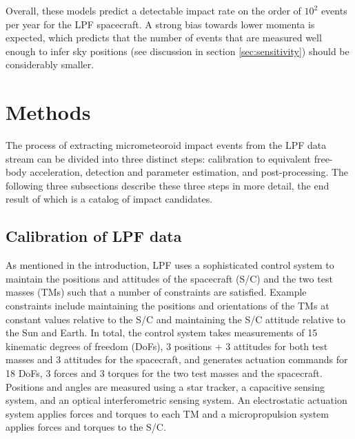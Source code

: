 \documentclass[twocolumn, trackchanges]{aastex62}
\begin{document}
Overall, these models predict a detectable impact rate on the order of $10^2$ events per year for the LPF spacecraft.  A strong bias towards lower momenta is expected, which predicts that the number of events that are measured well enough to infer sky positions (see discussion in section \ref{sec:sensitivity}) should be considerably smaller. 

\section{Methods} \label{sec:methods}
The process of extracting micrometeoroid impact events from the LPF data stream can be divided into three distinct steps: calibration to equivalent free-body acceleration, detection and parameter estimation, and post-processing.  The following three subsections describe these three steps in more detail, the end result of which is a catalog of impact candidates.


\subsection{Calibration of LPF data}\label{sec:calibration}
As mentioned in the introduction, LPF uses a sophisticated control system to maintain the positions and attitudes of the spacecraft (S/C) and the two test masses (TMs) such that a number of constraints are satisfied.  Example constraints include maintaining the positions and orientations of the TMs at constant values relative to the S/C and maintaining the S/C attitude relative to the Sun and Earth. In total, the control system takes measurements of 15 kinematic degrees of freedom (DoFs), 3 positions + 3 attitudes for both test masses and 3 attitudes for the spacecraft, and generates actuation commands for 18 DoFs, 3 forces and 3 torques for the two test masses and the spacecraft.  Positions and angles are measured using a star tracker, a capacitive sensing system, and an optical interferometric sensing system. An electrostatic actuation system applies forces and torques to each TM and a micropropulsion system applies forces and torques to the S/C. 
\end{document}
